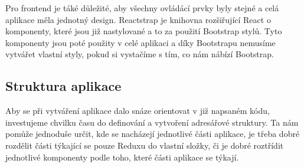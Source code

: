 Pro frontend je táké důležité, aby všechny ovládácí prvky byly stejné a celá aplikace měla jednotný design. Reactstrap je knihovna rozšiřující React o komponenty,
které jsou již nastylované a to za použití Bootstrap stylů. Tyto komponenty jsou poté použity v celé aplikaci a díky Bootstrapu nemusíme vytvářet vlastní styly,
pokud si vystačíme s tím, co nám nábízí Bootstrap.

\subsection{Struktura aplikace}

Aby se při vytváření aplikace dalo snáze orientovat v již napsaném kódu, investujeme chvilku času do definování a vytvoření adresářové struktury. Ta nám
pomůže jednoduše určit, kde se nacházejí jednotlivé části aplikace, je třeba dobré rozdělit části týkající se pouze Reduxu do vlastní složky, či je dobré roztřídit
jednotlivé komponenty podle toho, které části aplikace se týkají.
